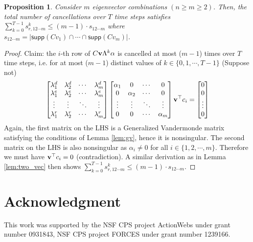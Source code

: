 \documentclass[journal]{IEEEtran}
\newtheorem{prop}{\bf{Proposition}}
\begin{document}
\begin{prop} \label{prop:m_vec}
Consider $m$ eigenvector combinations $(n\ge m \ge 2)$. Then, the total number of cancellations over $T$ time steps satisfies $\sum_{k=0}^{T-1} s_{r,12 \cdots m}^k \le (m-1)\cdot s_{12 \cdots m}$ where $s_{12\cdots m} = \lvert \textsf{supp} (Cv_1) \cap \cdots \cap \textsf{supp} (Cv_m) \rvert$.
\end{prop}
\begin{proof}
Claim: the $i$-th row of $C{\bf v}\Lambda^k \alpha$ is cancelled at most ($m-1$) times over $T$ time steps, i.e. for at most ($m-1$) distinct values of $k \in \{0, 1, \cdots, T-1\}$
(Suppose not)
\begin{equation}
\begin{aligned}
	&	\begin{bmatrix} \lambda_1^d & \lambda_2^d & \cdots & \lambda_m^d \\
					\lambda_1^e & \lambda_2^e & \cdots & \lambda_m^e \\
					\vdots & \vdots & \ddots & \vdots \\
					\lambda_1^r& \lambda_2^r & \cdots & \lambda_m^r 
		\end{bmatrix} \begin{bmatrix} \alpha_1 & 0 & \cdots & 0 \\ 0 & \alpha_2 & \cdots & 0 \\ 
					\vdots & \vdots & \ddots & \vdots \\
					0 & 0 & \cdots & \alpha_m \end{bmatrix} 
					{\bf v}^\top c_i 
		= \begin{bmatrix} 0 \\ 0 \\ \vdots \\ 0 \end{bmatrix} \nonumber\\
\end{aligned}
\end{equation}
Again, the first matrix on the LHS is a Generalized Vandermonde matrix satisfying the conditions of Lemma \ref{lem:gv}, hence it is nonsingular. The second matrix on the LHS is also nonsingular as $\alpha_i \neq 0$ for all $i \in \{1, 2, \cdots, m\}$. Therefore we must have ${\bf v}^\top c_i = 0$ (contradiction). A similar derivation as in Lemma \ref{lem:two_vec} then shows $\sum_{k=0}^{T-1} s_{r,12\cdots m}^ k \le (m-1) \cdot s_{12\cdots m}$.
\end{proof}



























\section*{Acknowledgment}
This work was supported by the NSF CPS project ActionWebs under grant number 0931843, NSF CPS project FORCES under grant number
1239166.









\end{document}
